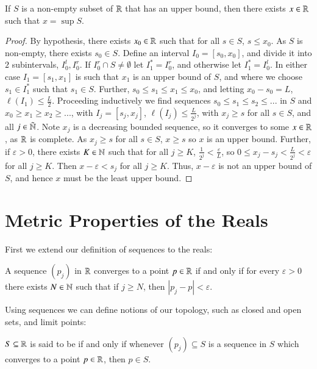 \begin{proposition}\label{prop:1.6.12}
    If $S$ is a non-empty subset of $\mathbb R$ that has an upper bound, then there exists $x \in \mathbb R$ such that $x = \sup S$.
\end{proposition}
\begin{proof}
    By hypothesis, there exists $x_0 \in \mathbb R$ such that for all $s \in S$, $s \leq x_0$. As $S$ is non-empty, there exists $s_0 \in S$. Define an interval $I_0 = [s_0,x_0]$, and divide it into $2$ subintervals, $I_0^l,I_0^r$. If $I_0^r\cap S \neq \emptyset$ let $I_1^* = I_0^r$, and otherwise let $I_1^* = I_0^l$. In either case $I_1 = [s_1,x_1]$ is such that $x_1$ is an upper bound of $S$, and where we choose $s_1 \in I_1^*$ such that $s_1 \in S$. Further, $s_0 \leq s_1 \leq x_1 \leq x_0$, and letting $x_0 - s_0 = L$, $\ell(I_1) \leq \frac{L}{2}$. Proceeding inductively we find sequences $s_0\leq s_1\leq s_2 \leq ...$ in $S$ and $x_0 \geq x_1 \geq x_2 \geq ...$, with $I_j = [s_j,x_j]$, $\ell(I_j) \leq \frac{L}{2^j}$, with $x_j \geq s$ for all $s \in S$, and all $j \in \tilde{\mathbb N}$. Note $x_j$ is a decreasing bounded sequence, so it converges to some $x \in \mathbb R$, as $\mathbb R$ is complete. As $x_j \geq s$ for all $s \in S$, $x \geq s$ so $x$ is an upper bound. Further, if $\varepsilon > 0$, there exists $K \in \mathbb N$ such that for all $j \geq K$, $\frac{1}{2^j} < \frac{\varepsilon}{L}$, so $0 \leq x_j - s_j < \frac{L}{2^j} < \varepsilon$ for all $j \geq K$. Then $x-\varepsilon < s_j$ for all $j \geq K$. Thus, $x-\varepsilon$ is not an upper bound of $S$, and hence $x$ must be the least upper bound.
\end{proof}


\section{Metric Properties of the Reals}

First we extend our definition of sequences to the reals:

\begin{definition}
    A sequence $(p_j)$ in $\mathbb R$ converges to a point $p \in \mathbb R$ if and only if for every $\varepsilon > 0$ there exists $N \in \mathbb N$ such that if $j \geq N$, then $|p_j - p| < \varepsilon$.
\end{definition}

Using sequences we can define notions of our topology, such as closed and open sets, and limit points:

\begin{definition}
    $S \subseteq \mathbb R$ is said to be  if and only if whenever $(p_j) \subseteq S$ is a sequence in $S$ which converges to a point $p \in \mathbb R$, then $p \in S$.
\end{definition}

